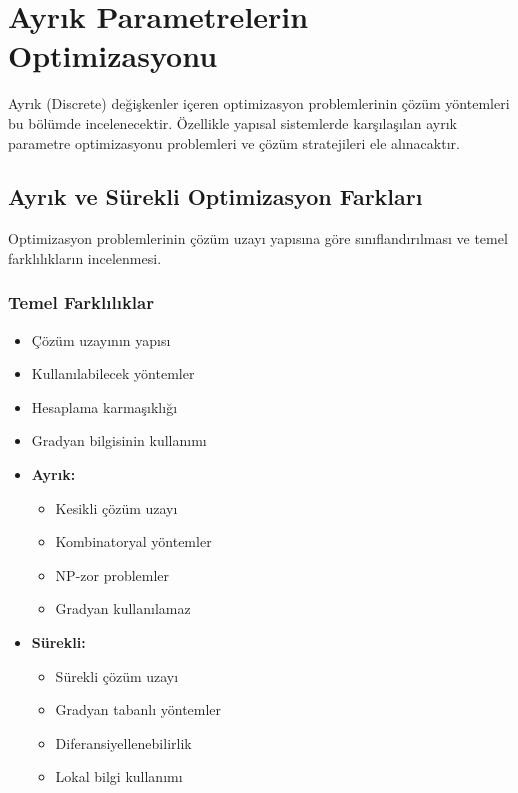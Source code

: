 \section{Ayrık Parametrelerin Optimizasyonu}
Ayrık (Discrete) değişkenler içeren optimizasyon problemlerinin çözüm yöntemleri bu bölümde incelenecektir. Özellikle yapısal sistemlerde karşılaşılan ayrık parametre optimizasyonu problemleri ve çözüm stratejileri ele alınacaktır.

\subsection{Ayrık ve Sürekli Optimizasyon Farkları}
Optimizasyon problemlerinin çözüm uzayı yapısına göre sınıflandırılması ve temel farklılıkların incelenmesi.

\subsubsection{Temel Farklılıklar}
\begin{itemize}
    \item Çözüm uzayının yapısı
    \item Kullanılabilecek yöntemler
    \item Hesaplama karmaşıklığı
    \item Gradyan bilgisinin kullanımı
\end{itemize}

\begin{tcolorbox}[title=Ayrık vs Sürekli Optimizasyon]
\begin{itemize}
    \item \textbf{Ayrık:}
        \begin{itemize}
            \item Kesikli çözüm uzayı
            \item Kombinatoryal yöntemler
            \item NP-zor problemler
            \item Gradyan kullanılamaz
        \end{itemize}
    \item \textbf{Sürekli:}
        \begin{itemize}
            \item Sürekli çözüm uzayı
            \item Gradyan tabanlı yöntemler
            \item Diferansiyellenebilirlik
            \item Lokal bilgi kullanımı
        \end{itemize}
\end{itemize}
\end{tcolorbox}


